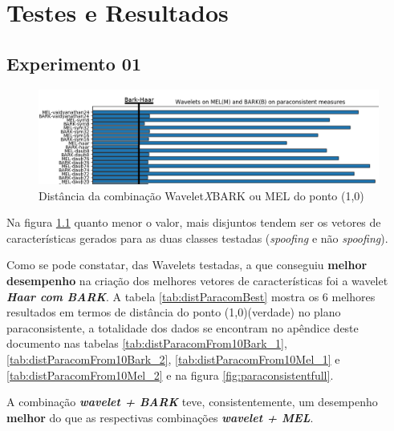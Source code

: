 \chapter{Testes e Resultados} \label{chap:testsResults}
	\begin{myenv}{1.5}
		\section{Experimento 01}
		\begin{figure}[h]
			\centering
			\includegraphics[width=\linewidth]{images/results/paraconsistentPlane/ParaconsistentParcial.png}
			\caption{Distância da combinação Wavelet\textit{X}BARK ou MEL do ponto (1,0)}
			\label{fig:ParaconsistentParcial}
		\end{figure}

		

		\par Na figura \ref{fig:ParaconsistentParcial} quanto menor o valor, mais disjuntos tendem ser os vetores de características gerados para as duas classes testadas (\textit{spoofing }e não \textit{spoofing}).

		\par Como se pode constatar, das Wavelets testadas, a que conseguiu \textbf{melhor desempenho} na criação dos melhores vetores de características foi a wavelet \textit{\textbf{Haar com BARK}}. A tabela \ref{tab:distParacomBest} mostra os 6 melhores resultados em termos de distância do ponto (1,0)(verdade) no plano paraconsistente, a totalidade dos dados se encontram no apêndice deste documento nas tabelas \ref{tab:distParacomFrom10Bark_1}, \ref{tab:distParacomFrom10Bark_2}, \ref{tab:distParacomFrom10Mel_1} e \ref{tab:distParacomFrom10Mel_2} e na figura \ref{fig:paraconsistentfull}.
		
		\par A combinação \textbf{\textit{wavelet + BARK}} teve, consistentemente, um desempenho \textbf{melhor} do que as respectivas combinações \textbf{\textit{wavelet + MEL}}.
		
		\par 
		

\end{myenv}
